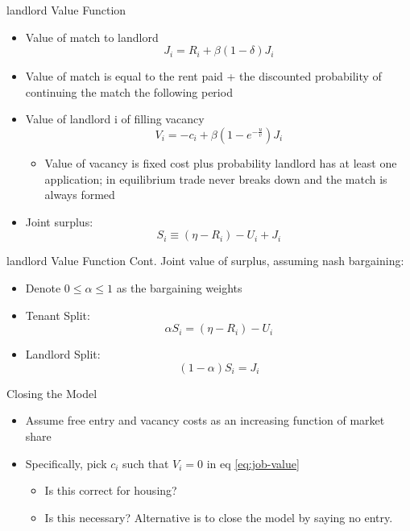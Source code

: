 \documentclass[10pt, xcolor=dvipsnames]{beamer}
\begin{document}
\begin{frame}{landlord Value Function}
    \begin{itemize}
    \item Value of match to landlord \begin{equation}
        J_i = R_i + \beta(1 - \delta)J_i
    \end{equation} 
    \item Value of match is equal to the rent paid + the discounted probability of continuing the match the following period 
    \item Value of landlord i of filling vacancy \begin{equation}\label{eq:job-value}
        V_i = -c_i + \beta(1  - e^{-\frac{u}{v}})J_i
    \end{equation}
    \begin{itemize}
        \item Value of vacancy is fixed cost plus probability landlord has at least one application; in equilibrium trade never breaks down and the match is always formed 
    \end{itemize}
    \item Joint surplus: \begin{equation}\label{eq:surplus-value}
        S_i \equiv (\eta - R_i) - U_i + J_i
    \end{equation}
    \end{itemize}
\end{frame}

\begin{frame}{landlord Value Function Cont.}
Joint value of surplus, assuming nash bargaining:
    \begin{itemize}
        \item Denote $0\leq \alpha \leq 1$ as the bargaining weights
        \item Tenant Split: \begin{equation}\label{eq:nash-tenant}
            \alpha S_i = (\eta - R_i) - U_i
        \end{equation}
        \item Landlord Split: \begin{equation}\label{eq:nash-landlord}
            (1-\alpha)S_i = J_i
        \end{equation}
    \end{itemize}
\end{frame}

\begin{frame}{Closing the Model}
    \begin{itemize}
    \item Assume free entry and vacancy costs as an increasing function of market share
    \item Specifically, pick $c_i$ such that $V_i=0$ in eq \ref{eq:job-value}
    \begin{itemize}
        \item Is this correct for housing?
        \item Is this necessary? Alternative is to close the model by saying no entry.
    \end{itemize}
\end{itemize}
\end{frame}
\end{document}
